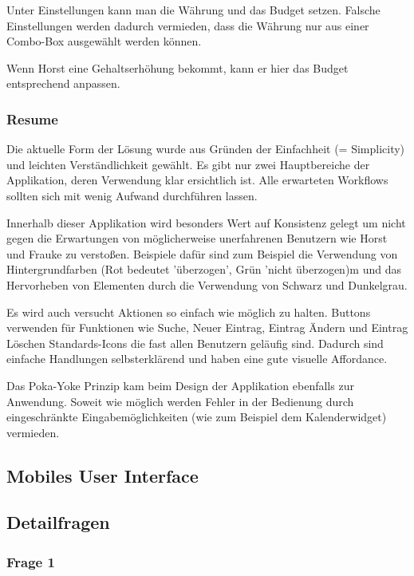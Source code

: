 Unter Einstellungen kann man die W\"ahrung und das Budget setzen. Falsche
Einstellungen werden dadurch vermieden, dass die W\"ahrung nur aus einer
Combo-Box ausgew\"ahlt werden k\"onnen.

Wenn Horst eine Gehaltserh\"ohung bekommt, kann er hier das Budget entsprechend
anpassen.

\subsubsection{Resume}

Die aktuelle Form der L\"osung wurde aus Gründen der Einfachheit (= Simplicity) und leichten Verst\"andlichkeit gew\"ahlt.
Es gibt nur zwei Hauptbereiche der Applikation, deren Verwendung klar ersichtlich ist.
Alle erwarteten Workflows sollten sich mit wenig Aufwand durchf\"uhren lassen.

Innerhalb dieser Applikation wird besonders Wert auf Konsistenz gelegt um nicht gegen die Erwartungen
von m\"oglicherweise unerfahrenen Benutzern wie Horst und Frauke zu versto\ss en. Beispiele daf\"ur sind
zum Beispiel die Verwendung von Hintergrundfarben (Rot bedeutet '\"uberzogen', Gr\"un 'nicht \"uberzogen)m
und das Hervorheben von Elementen durch die Verwendung von Schwarz und Dunkelgrau.

Es wird auch versucht Aktionen so einfach wie m\"oglich zu halten. Buttons verwenden f\"ur Funktionen wie
Suche, Neuer Eintrag, Eintrag \"Andern und Eintrag L\"oschen Standards-Icons die fast allen Benutzern gel\"aufig sind.
Dadurch sind einfache Handlungen selbsterkl\"arend und haben eine gute visuelle Affordance.

Das Poka-Yoke Prinzip kam beim Design der Applikation ebenfalls zur Anwendung. Soweit
wie m\"oglich werden Fehler in der Bedienung durch eingeschr\"ankte Eingabem\"oglichkeiten (wie zum Beispiel dem
Kalenderwidget) vermieden.

\subsection{Mobiles User Interface}
\subsection{Detailfragen}

\subsubsection{Frage 1}


